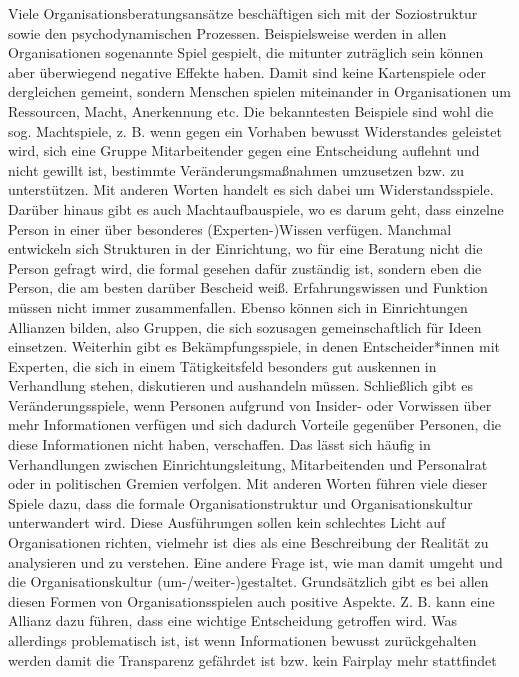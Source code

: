 \documentclass[
  letterpaper,
]{book}
\begin{document}
Viele Organisationsberatungsansätze beschäftigen sich mit der
Soziostruktur sowie den psychodynamischen Prozessen. Beispielsweise
werden in allen Organisationen sogenannte Spiel gespielt, die mitunter
zuträglich sein können aber überwiegend negative Effekte haben. Damit
sind keine Kartenspiele oder dergleichen gemeint, sondern Menschen
spielen miteinander in Organisationen um Ressourcen, Macht, Anerkennung
etc. Die bekanntesten Beispiele sind wohl die sog. Machtspiele, z. B.
wenn gegen ein Vorhaben bewusst Widerstandes geleistet wird, sich eine
Gruppe Mitarbeitender gegen eine Entscheidung auflehnt und nicht gewillt
ist, bestimmte Veränderungsmaßnahmen umzusetzen bzw. zu unterstützen.
Mit anderen Worten handelt es sich dabei um Widerstandsspiele. Darüber
hinaus gibt es auch Machtaufbauspiele, wo es darum geht, dass einzelne
Person in einer über besonderes (Experten-)Wissen verfügen. Manchmal
entwickeln sich Strukturen in der Einrichtung, wo für eine Beratung
nicht die Person gefragt wird, die formal gesehen dafür zuständig ist,
sondern eben die Person, die am besten darüber Bescheid weiß.
Erfahrungswissen und Funktion müssen nicht immer zusammenfallen. Ebenso
können sich in Einrichtungen Allianzen bilden, also Gruppen, die sich
sozusagen gemeinschaftlich für Ideen einsetzen. Weiterhin gibt es
Bekämpfungsspiele, in denen Entscheider*innen mit Experten, die sich in
einem Tätigkeitsfeld besonders gut auskennen in Verhandlung stehen,
diskutieren und aushandeln müssen. Schließlich gibt es
Veränderungsspiele, wenn Personen aufgrund von Insider- oder Vorwissen
über mehr Informationen verfügen und sich dadurch Vorteile gegenüber
Personen, die diese Informationen nicht haben, verschaffen. Das lässt
sich häufig in Verhandlungen zwischen Einrichtungsleitung,
Mitarbeitenden und Personalrat oder in politischen Gremien verfolgen.
Mit anderen Worten führen viele dieser Spiele dazu, dass die formale
Organisationstruktur und Organisationskultur unterwandert wird. Diese
Ausführungen sollen kein schlechtes Licht auf Organisationen richten,
vielmehr ist dies als eine Beschreibung der Realität zu analysieren und
zu verstehen. Eine andere Frage ist, wie man damit umgeht und die
Organisationskultur (um-/weiter-)gestaltet. Grundsätzlich gibt es bei
allen diesen Formen von Organisationsspielen auch positive Aspekte. Z.
B. kann eine Allianz dazu führen, dass eine wichtige Entscheidung
getroffen wird. Was allerdings problematisch ist, ist wenn Informationen
bewusst zurückgehalten werden damit die Transparenz gefährdet ist bzw.
kein Fairplay mehr stattfindet
\end{document}
